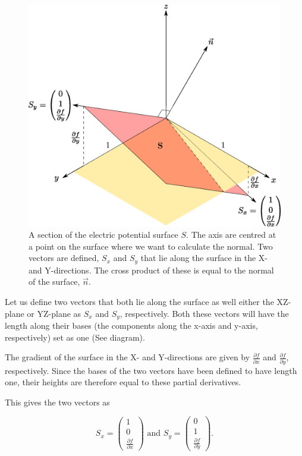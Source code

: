 \documentclass{article} %
\begin{document}
 \begin{figure}
    \includegraphics[width=\linewidth]{diagram.eps}
    \caption{A section of the electric potential surface $S$. The axis are centred at a point on the surface where we want to calculate the normal. Two vectors are defined, $S_x$ and $S_y$ that lie along the surface in the X- and Y-directions. The cross product of these is equal to the normal of the surface, $\vec{n}$.}
    \label{fig:diagram}
    \end{figure}

 Let us define two vectors that both lie along the surface as well either the XZ-plane or YZ-plane as $S_x$ and $S_y$, respectively. Both these vectors will have the length along their bases (the components along the x-axis and y-axis, respectively) set as one (See diagram).

 The gradient of the surface in the X- and Y-directions are given by $\frac{\partial f}{\partial x}$ and $\frac{\partial f}{\partial y}$, respectively. Since the bases of the two vectors have been defined to have length one, their heights are therefore equal to these partial derivatives.

 This gives the two vectors as

$$
S_x = \begin{pmatrix}1 \\ 0 \\ \frac{\partial f}{\partial x}\end{pmatrix}\textrm{ and }
S_y = \begin{pmatrix}0 \\ 1 \\ \frac{\partial f}{\partial y}\end{pmatrix}.
$$
\end{document}

